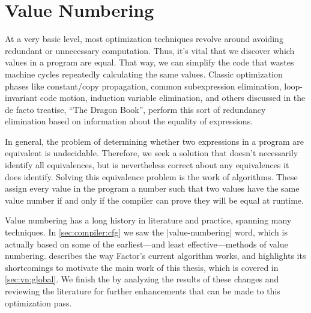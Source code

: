 \section{Value Numbering}\label{sec:vn}

At a very basic level, most optimization techniques revolve around avoiding
redundant or unnecessary computation.  Thus, it's vital that we discover which
values in a program are equal.  That way, we can simplify the code that wastes
machine cycles repeatedly calculating the same values.  Classic optimization
phases like constant/copy propagation, common subexpression elimination,
loop-invariant code motion, induction variable elimination, and others
discussed in the de facto treatise, ``The Dragon Book'', perform
this sort of redundancy elimination based on information about the equality of
expressions.

In general, the problem of determining whether two expressions in a program are
equivalent is undecidable.  Therefore, we seek a  solution
that doesn't necessarily identify all equivalences, but is nevertheless correct
about any equivalences it does identify.  Solving this equivalence problem is
the work of  algorithms.  These assign every value in the
program a number such that two values have the same value number if and only if
the compiler can prove they will be equal at runtime.

Value numbering has a long history in literature and practice, spanning many
techniques.  In \cref{sec:compiler:cfg} we saw the \factor|value-numbering|
word, which is actually based on some of the earliest---and least
effective---methods of value numbering.   describes the way
Factor's current algorithm works, and highlights its shortcomings to motivate
the main work of this thesis, which is covered in \cref{sec:vn:global}.  We
finish the  by analyzing the results of these changes and
reviewing the literature for further enhancements that can be made to this
optimization pass.

%

%
%

